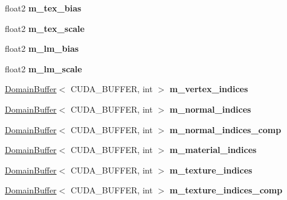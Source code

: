 \begin{DoxyCompactItemize}
float2 {\bfseries m\+\_\+tex\+\_\+bias}
\item 
\mbox{\label{class_device_mesh_storage_a27af8333811b06f13ce9cab6bd132474}} 
float2 {\bfseries m\+\_\+tex\+\_\+scale}
\item 
\mbox{\label{class_device_mesh_storage_a17696794ea9e5db8892ed811d1dcca99}} 
float2 {\bfseries m\+\_\+lm\+\_\+bias}
\item 
\mbox{\label{class_device_mesh_storage_a294c50b54ed48f7b19c0184ff8ba2a1c}} 
float2 {\bfseries m\+\_\+lm\+\_\+scale}
\item 
\mbox{\label{class_device_mesh_storage_a775e7c8e6f70e38cfbaeade8654ec558}} 
\hyperlink{class_domain_buffer}{Domain\+Buffer}$<$ C\+U\+D\+A\+\_\+\+B\+U\+F\+F\+ER, int $>$ {\bfseries m\+\_\+vertex\+\_\+indices}
\item 
\mbox{\label{class_device_mesh_storage_ac17c11ead9316420565a31f1e021bcf4}} 
\hyperlink{class_domain_buffer}{Domain\+Buffer}$<$ C\+U\+D\+A\+\_\+\+B\+U\+F\+F\+ER, int $>$ {\bfseries m\+\_\+normal\+\_\+indices}
\item 
\mbox{\label{class_device_mesh_storage_abffffc1986968e01b082dd1c386f798f}} 
\hyperlink{class_domain_buffer}{Domain\+Buffer}$<$ C\+U\+D\+A\+\_\+\+B\+U\+F\+F\+ER, int $>$ {\bfseries m\+\_\+normal\+\_\+indices\+\_\+comp}
\item 
\mbox{\label{class_device_mesh_storage_a79d1a5a4d3aff01dc0942ea804dc4f51}} 
\hyperlink{class_domain_buffer}{Domain\+Buffer}$<$ C\+U\+D\+A\+\_\+\+B\+U\+F\+F\+ER, int $>$ {\bfseries m\+\_\+material\+\_\+indices}
\item 
\mbox{\label{class_device_mesh_storage_a4c7e30214e463d8ba9f67c6cf0df11ee}} 
\hyperlink{class_domain_buffer}{Domain\+Buffer}$<$ C\+U\+D\+A\+\_\+\+B\+U\+F\+F\+ER, int $>$ {\bfseries m\+\_\+texture\+\_\+indices}
\item 
\mbox{\label{class_device_mesh_storage_a684d54c92a49b680fd3077caadf109d7}} 
\hyperlink{class_domain_buffer}{Domain\+Buffer}$<$ C\+U\+D\+A\+\_\+\+B\+U\+F\+F\+ER, int $>$ {\bfseries m\+\_\+texture\+\_\+indices\+\_\+comp}

\end{DoxyCompactItemize}
